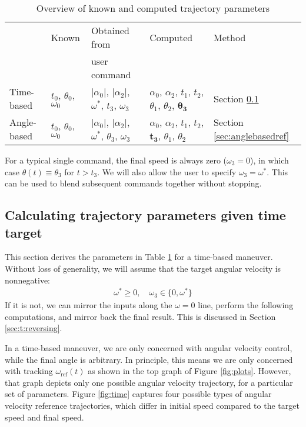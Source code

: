 \documentclass[12pt, a4paper]
{article}
\providecommand{\sub}[1]{_{\text{#1}}}
\providecommand{\w}{\omega}
\providecommand{\wt}{\w^*}
\providecommand{\wref}{\w\sub{ref}}
\renewcommand{\th}{\theta}
\renewcommand{\a}{\alpha}
\providecommand{\w}{\omega}
\providecommand{\abs}[1]{\left|#1\right|}
\begin{document}
\begin{table}[H]
    \centering
    \caption{Overview of known and computed trajectory parameters}
    \label{tab:parameters}
    \begin{tabular}{@{}lllll@{}}
    \toprule
                & Known    & Obtained from & Computed & Method \\
                &          & user command  &          &        \\ \midrule
    Time-based  &
        $t_0$, $\th_0$, $\w_0$ &
        $\abs{\a_0}$, $\abs{\a_2}$, $\wt$, $t_3$, $\w_3$ &
        $\a_0$, $\a_2$, $t_1$, $t_2$, $\th_1$, $\th_2$, $\boldsymbol{\th_3}$
        & Section \ref{sec:timebasedref}\\
    Angle-based &
        $t_0$, $\th_0$, $\w_0$ &
        $\abs{\a_0}$, $\abs{\a_2}$, $\wt$, $\th_3$, $\w_3$ &
        $\a_0$, $\a_2$, $t_1$, $t_2$, $\boldsymbol{t_3}$, $\th_1$, $\th_2$ &
        Section \ref{sec:anglebasedref}  \\
        \bottomrule
    \end{tabular}
\end{table}

For a typical single command, the final speed is always zero ($\w_3 = 0$), in
which case $\th(t) \equiv \th_3$ for $t > t_3$. We will also allow the user to
specify $\w_3 = \wt$. This can be used to blend subsequent commands together
without stopping.


\subsection{Calculating trajectory parameters given time target}
\label{sec:timebasedref}
This section derives the parameters in Table \ref{tab:parameters} for a
time-based maneuver. Without loss of generality, we will assume that the
target angular velocity is nonnegative:
%
\begin{align}
    \label{eq:t:forwardmaneuver}
    \wt \geq 0, \quad \w_3 \in \{0, \wt\}
\end{align}
%
If it is not, we can mirror the inputs along the $\w=0$ line, perform the
following computations, and mirror back the final result. This is discussed
in Section \ref{sec:t:reversing}.

In a time-based maneuver, we are only concerned with angular velocity control,
while the final angle is arbitrary. In principle, this means we are only
concerned with tracking $\wref(t)$ as shown in the top graph of
Figure \ref{fig:plots}. However, that graph depicts only one possible angular
velocity trajectory, for a particular set of parameters.
Figure \ref{fig:time} captures four possible types of angular velocity
reference trajectories, which differ in initial speed compared to the
target speed and final speed.
\end{document}
